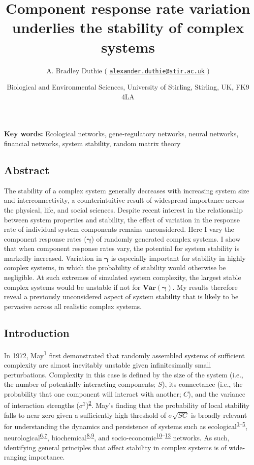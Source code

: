 \documentclass[]{article}
\title{Component response rate variation underlies the stability of complex
systems}
\author{A. Bradley Duthie (
\href{mailto:alexander.duthie@stir.ac.uk}{\nolinkurl{alexander.duthie@stir.ac.uk}}
)}
\date{Biological and Environmental Sciences, University of Stirling, Stirling,
UK, FK9 4LA}
\begin{document}
\maketitle

\textbf{Key words:} Ecological networks, gene-regulatory networks,
neural networks, financial networks, system stability, random matrix
theory

\subsection{Abstract}\label{abstract}

The stability of a complex system generally decreases with increasing
system size and interconnectivity, a counterintuitive result of
widespread importance across the physical, life, and social sciences.
Despite recent interest in the relationship between system properties
and stability, the effect of variation in the response rate of
individual system components remains unconsidered. Here I vary the
component response rates (\(\boldsymbol{\gamma}\)) of randomly generated
complex systems. I show that when component response rates vary, the
potential for system stability is markedly increased. Variation in
\(\boldsymbol{\gamma}\) is especially important for stability in highly
complex systems, in which the probability of stability would otherwise
be negligible. At such extremes of simulated system complexity, the
largest stable complex systems would be unstable if not for
\(\boldsymbol{Var(\gamma)}\). My results therefore reveal a previously
unconsidered aspect of system stability that is likely to be pervasive
across all realistic complex systems.

\subsection{Introduction}\label{introduction}

In 1972, May\textsuperscript{\protect\hyperlink{ref-May1972}{1}} first
demonstrated that randomly assembled systems of sufficient complexity
are almost inevitably unstable given infinitesimally small
perturbations. Complexity in this case is defined by the size of the
system (i.e., the number of potentially interacting components; \(S\)),
its connectance (i.e., the probability that one component will interact
with another; \(C\)), and the variance of interaction strengths
(\(\sigma^{2}\))\textsuperscript{\protect\hyperlink{ref-Allesina2012}{2}}.
May's finding that the probability of local stability falls to near zero
given a sufficiently high threshold of \(\sigma\sqrt{SC}\) is broadly
relevant for understanding the dynamics and persistence of systems such
as
ecological\textsuperscript{\protect\hyperlink{ref-May1972}{1}--\protect\hyperlink{ref-Grilli2017}{5}},
neurological\textsuperscript{\protect\hyperlink{ref-Gray2008}{6},\protect\hyperlink{ref-Gray2009}{7}},
biochemical\textsuperscript{\protect\hyperlink{ref-Rosenfeld2009}{8},\protect\hyperlink{ref-MacArthur2010}{9}},
and
socio-economic\textsuperscript{\protect\hyperlink{ref-May2008}{10}--\protect\hyperlink{ref-Bardoscia2017}{13}}
networks. As such, identifying general principles that affect stability
in complex systems is of wide-ranging importance.
\end{document}
